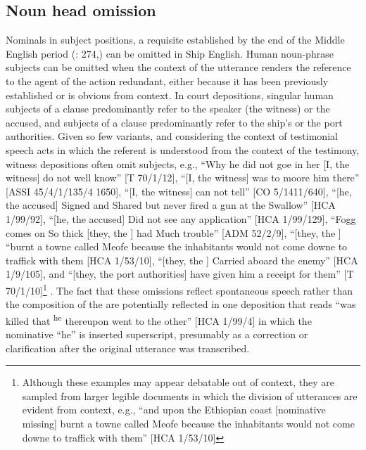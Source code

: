 \subsection{{Noun head omission} }%

Nominals in subject positions, a requisite established by the end of the Middle English period (\citealt{MillwardHayes2012}: 274,) can be omitted in Ship English. Human noun-phrase subjects can be omitted when the context of the utterance renders the reference to the agent of the action redundant, either because it has been previously established or is obvious from context. In court depositions, singular human subjects of a clause predominantly refer to the speaker (the witness) or the accused, and  subjects of a clause predominantly refer to the ship’s  or the port authorities. Given so few variants, and considering the context of testimonial speech acts in which the referent is understood from the context of the testimony, witness depositions often omit  subjects, e.g., “Why he did not goe in her [I, the witness] do not well know” [T 70/1/12], “[I, the witness] was to moore him there” [ASSI 45/4/1/135/4 1650], “[I, the witness] can not tell” [CO 5/1411/640], “[he, the accused] Signed and Shared but never fired a gun at the Swallow” [HCA 1/99/92], “[he, the accused] Did not see any application” [HCA 1/99/129], “Fogg comes on So thick [they, the ] had Much trouble” [ADM 52/2/9], “[they, the ] “burnt a towne called Meofe because the inhabitants would not come downe to traffick with them [HCA 1/53/10], “[they, the ] Carried aboard the enemy” [HCA 1/9/105], and “[they, the port authorities] have given him a receipt for them” [T 70/1/10]\footnote{Although these examples may appear debatable out of context, they are sampled from larger legible documents in which the division of utterances are evident from context, e.g., “and upon the Ethiopian coast [nominative missing] burnt a towne called Meofe because the inhabitants would not come downe to traffick with them” [HCA 1/53/10]} . The fact that these omissions reflect spontaneous speech rather than the composition of the  are potentially reflected in one deposition that reads “was killed that \textsuperscript{he} thereupon went to the other” [HCA 1/99/4] in which the nominative  “he” is inserted superscript, presumably as a correction or clarification after the original utterance was transcribed. 

